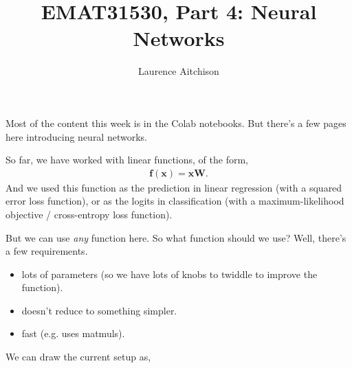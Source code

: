 \documentclass{article}
\title{EMAT31530, Part 4: Neural Networks}
\author{Laurence Aitchison}
\date{}
\newcommand{\x}{\mathbf{x}}
\newcommand{\y}{\mathbf{y}}
\newcommand{\f}{\mathbf{f}}
\newcommand{\W}{\mathbf{W}}
\begin{document}
\maketitle

Most of the content this week is in the Colab notebooks.  But there's a few pages here introducing neural networks.

So far, we have worked with linear functions, of the form,
\begin{align}
  \f(\x) = \x\W.
\end{align}
And we used this function as the prediction in linear regression (with a squared error loss function), or as the logits in classification (with a maximum-likelihood objective / cross-entropy loss function).

But we can use \textit{any} function here.
So what function should we use?
Well, there's a few requirements.
\begin{itemize}
  \item lots of parameters (so we have lots of knobs to twiddle to improve the function).      
  \item doesn't reduce to something simpler.
  \item fast (e.g. uses matmuls).
\end{itemize}

We can draw the current setup as,

\begin{center}
\end{center}
\end{document}
